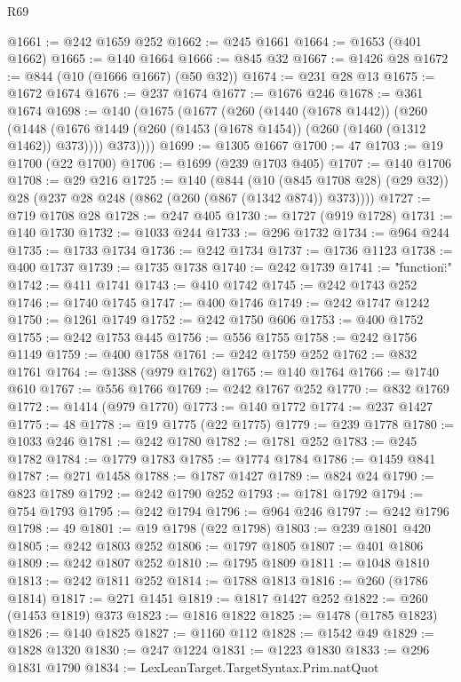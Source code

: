 \begin{lexlean}{R69}
\begin{coremodule}
@1661 := @242 @1659 @252
@1662 := @245 @1661
@1664 := @1653 (@401 @1662)
@1665 := @140 @1664
@1666 := @845 @32
@1667 := @1426 @28
@1672 := @844 (@10 (@1666 @1667) (@50 @32))
@1674 := @231 @28 @13
@1675 := @1672 @1674
@1676 := @237 @1674
@1677 := @1676 @246
@1678 := @361 @1674
@1698 := @140
    (@1675
      (@1677
        (@260
          (@1440 (@1678 @1442))
          (@260
            (@1448 (@1676 @1449 (@260 (@1453 (@1678 @1454)) (@260 (@1460 (@1312 @1462)) @373))))
            @373))))
@1699 := @1305 @1667
@1700 := 47
@1703 := @19 @1700 (@22 @1700)
@1706 := @1699 (@239 @1703 @405)
@1707 := @140 @1706
@1708 := @29 @216
@1725 := @140
    (@844
      (@10 (@845 @1708 @28) (@29 @32))
      @28
      (@237 @28 @248 (@862 (@260 (@867 (@1342 @874)) @373))))
@1727 := @719 @1708 @28
@1728 := @247 @405
@1730 := @1727 (@919 @1728)
@1731 := @140 @1730
@1732 := @1033 @244
@1733 := @296 @1732
@1734 := @964 @244
@1735 := @1733 @1734
@1736 := @242 @1734
@1737 := @1736 @1123
@1738 := @400 @1737
@1739 := @1735 @1738
@1740 := @242 @1739
@1741 := "{\"function\":"
@1742 := @411 @1741
@1743 := @410 @1742
@1745 := @242 @1743 @252
@1746 := @1740 @1745
@1747 := @400 @1746
@1749 := @242 @1747 @1242
@1750 := @1261 @1749
@1752 := @242 @1750 @606
@1753 := @400 @1752
@1755 := @242 @1753 @445
@1756 := @556 @1755
@1758 := @242 @1756 @1149
@1759 := @400 @1758
@1761 := @242 @1759 @252
@1762 := @832 @1761
@1764 := @1388 (@979 @1762)
@1765 := @140 @1764
@1766 := @1740 @610
@1767 := @556 @1766
@1769 := @242 @1767 @252
@1770 := @832 @1769
@1772 := @1414 (@979 @1770)
@1773 := @140 @1772
@1774 := @237 @1427
@1775 := 48
@1778 := @19 @1775 (@22 @1775)
@1779 := @239 @1778
@1780 := @1033 @246
@1781 := @242 @1780
@1782 := @1781 @252
@1783 := @245 @1782
@1784 := @1779 @1783
@1785 := @1774 @1784
@1786 := @1459 @841
@1787 := @271 @1458
@1788 := @1787 @1427
@1789 := @824 @24
@1790 := @823 @1789
@1792 := @242 @1790 @252
@1793 := @1781 @1792
@1794 := @754 @1793
@1795 := @242 @1794
@1796 := @964 @246
@1797 := @242 @1796
@1798 := 49
@1801 := @19 @1798 (@22 @1798)
@1803 := @239 @1801 @420
@1805 := @242 @1803 @252
@1806 := @1797 @1805
@1807 := @401 @1806
@1809 := @242 @1807 @252
@1810 := @1795 @1809
@1811 := @1048 @1810
@1813 := @242 @1811 @252
@1814 := @1788 @1813
@1816 := @260 (@1786 @1814)
@1817 := @271 @1451
@1819 := @1817 @1427 @252
@1822 := @260 (@1453 @1819) @373
@1823 := @1816 @1822
@1825 := @1478 (@1785 @1823)
@1826 := @140 @1825
@1827 := @1160 @112
@1828 := @1542 @49
@1829 := @1828 @1320
@1830 := @247 @1224
@1831 := @1223 @1830
@1833 := @296 @1831 @1790
@1834 := LexLeanTarget.TargetSyntax.Prim.natQuot
}
\end{coremodule}
\end{lexlean}
